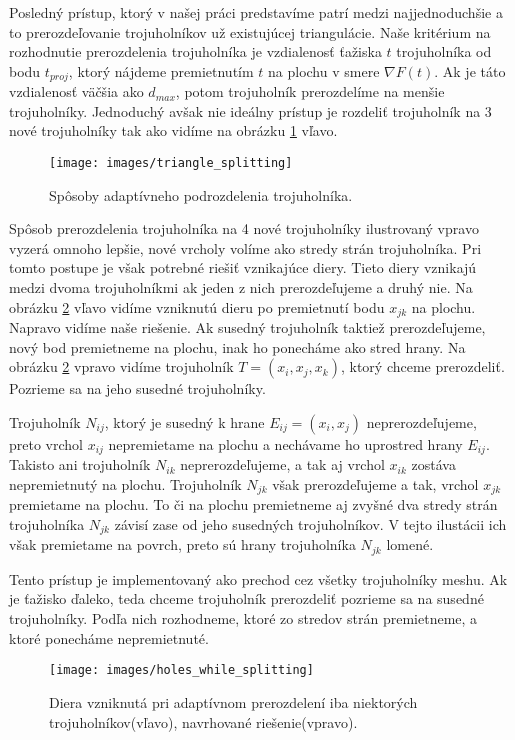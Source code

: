 Posledný prístup, ktorý v našej práci predstavíme patrí medzi najjednoduchšie a to prerozdeľovanie 
trojuholníkov už existujúcej triangulácie. Naše kritérium na rozhodnutie prerozdelenia trojuholníka
je vzdialenosť ťažiska $t$ trojuholníka od bodu $t_{proj}$, ktorý nájdeme premietnutím $t$ na plochu
v smere $\nabla F(t)$. Ak je táto vzdialenosť väčšia ako $d_{max}$, potom trojuholník prerozdelíme 
na menšie trojuholníky. Jednoduchý avšak nie ideálny prístup je rozdeliť trojuholník na 3 nové 
trojuholníky tak ako vidíme na obrázku \ref{obr:triangle_splitting} vľavo. 

\begin{figure}
    \centerline{\texttt{[image: images/triangle\_splitting]}}
    \caption[Spôsoby adaptívneho podrozdelenia trojuholníka]
    {Spôsoby adaptívneho podrozdelenia trojuholníka.}
    \label{obr:triangle_splitting}
\end{figure}

Spôsob prerozdelenia 
trojuholníka na 4 nové trojuholníky ilustrovaný vpravo vyzerá omnoho lepšie, nové vrcholy
volíme ako stredy strán trojuholníka. Pri tomto postupe je však potrebné riešiť vznikajúce diery.
Tieto diery vznikajú medzi dvoma trojuholníkmi ak jeden z nich prerozdeľujeme
a druhý nie. Na obrázku \ref{obr:holes_while_splitting} vľavo vidíme vzniknutú dieru po premietnutí bodu
$x_{jk}$ na plochu. Napravo vidíme naše riešenie. Ak susedný trojuholník taktiež prerozdeľujeme, nový bod
premietneme na plochu, inak ho ponecháme ako stred hrany. Na obrázku \ref{obr:holes_while_splitting} vpravo
vidíme trojuholník $T=(x_i, x_j, x_k)$, ktorý chceme prerozdeliť. Pozrieme sa na jeho susedné trojuholníky.

Trojuholník $N_{ij}$, ktorý je susedný k hrane $E_{ij} = (x_i, x_j)$ neprerozdeľujeme, preto vrchol $x_{ij}$ 
nepremietame na plochu a nechávame ho uprostred hrany $E_{ij}$. Takisto ani trojuholník $N_{ik}$ neprerozdeľujeme,
a tak aj vrchol $x_{ik}$ zostáva nepremietnutý na plochu.
Trojuholník $N_{jk}$ však prerozdeľujeme a tak, vrchol $x_{jk}$ premietame na plochu. To či na plochu premietneme aj 
zvyšné dva stredy strán trojuholníka $N_{jk}$ závisí zase od jeho susedných trojuholníkov. 
V tejto ilustácii ich však premietame na povrch, preto sú hrany trojuholníka $N_{jk}$ lomené.

Tento prístup je implementovaný ako 
prechod cez všetky trojuholníky meshu. Ak je ťažisko ďaleko, teda chceme trojuholník prerozdeliť
pozrieme sa na susedné trojuholníky. Podľa nich rozhodneme, ktoré zo stredov strán premietneme,
a ktoré ponecháme nepremietnuté.

\begin{figure}
    \centerline{\texttt{[image: images/holes\_while\_splitting]}}
    \caption[Úprava adaptívneho podrozdelenia trojuholníkov]
    {Diera vzniknutá pri adaptívnom prerozdelení iba niektorých trojuholníkov(vľavo), 
    navrhované riešenie(vpravo).}
    \label{obr:holes_while_splitting}
\end{figure}